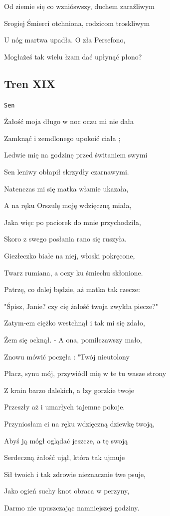 \documentclass{article}
\begin{document}
Od ziemie się co wznióswszy, duchem zaraźliwym

Srogiej Śmierci otchniona, rodzicom troskliwym

U nóg martwa upadła. O zła Persefono,

Mogłażeś tak wielu łzam dać upłynąć płono?

\subsection{Tren XIX}

\texttt{Sen}

Żałość moja długo w noc oczu mi nie dała

Zamknąć i zemdlonego upokoić ciała ;

Ledwie mię na godzinę przed świtaniem swymi

Sen leniwy obłapił skrzydły czarnawymi.

Natenczas mi się matka włamie ukazała,

A na ręku Orszulę moję wdzięczną miała,

Jaka więc po paciorek do mnie przychodziła,

Skoro z swego posłania rano się ruszyła.

Giezłeczko białe na niej, włoski pokręcone,

Twarz rumiana, a oczy ku śmiechu skłonione.

Patrzę, co dalej będzie, aż matka tak rzecze:

"Śpisz, Janie? czy cię żałość twoja zwykła piecze?"

Zatym-em ciężko westchnął i tak mi się zdało,

Żem się ocknął. - A ona, pomilczawszy mało,

Znowu mówić poczęła : "Twój nieutolony

Płacz, synu mój, przywiódł mię w te tu wasze strony

Z krain barzo dalekich, a łzy gorzkie twoje

Przeszły aż i umarłych tajemne pokoje.

Przyniosłam ci na ręku wdzięczną dziewkę twoją,

Abyś ją mógł oglądać jeszcze, a tę swoją

Serdeczną żałość ujął, która tak ujmuje

Sił twoich i tak zdrowie nieznacznie twe psuje,

Jako ogień suchy knot obraca w perzyny,

Darmo nie upuszczając namniejszej godziny.
\end{document}
